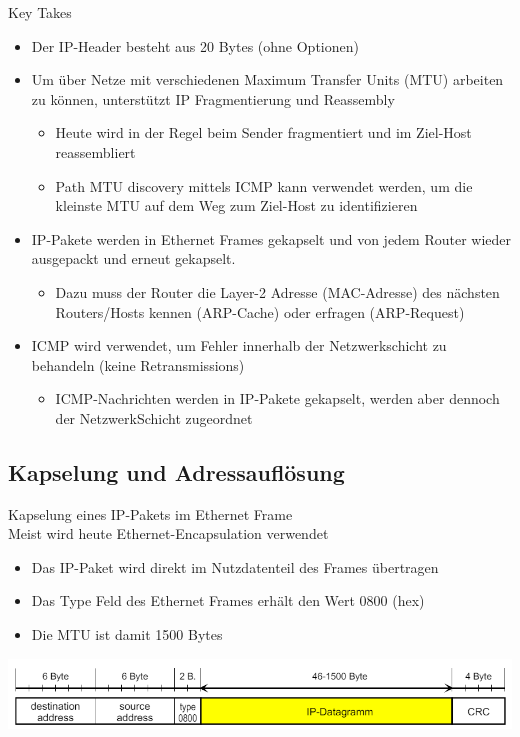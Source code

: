 \begin{KR}{Key Takes}
    \begin{itemize}
        \item Der IP-Header besteht aus 20 Bytes (ohne Optionen)
        \item Um über Netze mit verschiedenen Maximum Transfer Units (MTU) arbeiten zu können, unterstützt IP Fragmentierung und Reassembly
        \begin{itemize}
            \item Heute wird in der Regel beim Sender fragmentiert und im Ziel-Host reassembliert
            \item Path MTU discovery mittels ICMP kann verwendet werden, um die kleinste MTU auf dem Weg zum Ziel-Host zu identifizieren
        \end{itemize}
        \item IP-Pakete werden in Ethernet Frames gekapselt und von jedem Router wieder ausgepackt und erneut gekapselt.
        \begin{itemize}
            \item Dazu muss der Router die Layer-2 Adresse (MAC-Adresse) des nächsten Routers/Hosts kennen (ARP-Cache) oder erfragen (ARP-Request)
        \end{itemize}
        \item ICMP wird verwendet, um Fehler innerhalb der Netzwerkschicht zu behandeln (keine Retransmissions)
        \begin{itemize}
            \item ICMP-Nachrichten werden in IP-Pakete gekapselt, werden aber dennoch der NetzwerkSchicht zugeordnet
        \end{itemize}
    \end{itemize}
\end{KR}

\columnbreak

\subsection{Kapselung und Adressauflösung}

\begin{definition}{Kapselung eines IP-Pakets im Ethernet Frame}\\
    Meist wird heute Ethernet-Encapsulation verwendet
    \begin{itemize}
        \item Das IP-Paket wird direkt im Nutzdatenteil des Frames übertragen
        \item Das Type Feld des Ethernet Frames erhält den Wert 0800 (hex)
        \item Die MTU ist damit 1500 Bytes
    \end{itemize}
        \includegraphics[width=1\linewidth]{images/kapselung_ip_paket.png}
\end{definition}

